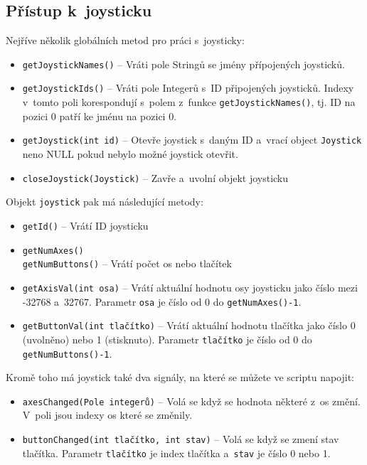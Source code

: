 \documentclass[12pt, a4paper, oneside]{article}
\begin{document}
\newpage
\subsection*{Přístup k~joysticku}
Nejříve několik globálních metod pro práci s~joysticky:
\begin{itemize}
    \item {\color{blue}\verb/getJoystickNames()/} -- Vráti pole Stringů se jmény přípojených joysticků.
    \item {\color{blue}\verb/getJoystickIds()/} -- Vráti pole Integerů s~ID připojených joysticků. Indexy v~tomto poli korespondují s~polem z~funkce \verb|getJoystickNames()|, tj. ID na pozici 0 patří ke jménu na pozici 0.
    \item {\color{blue}\verb/getJoystick(int id)/} -- Otevře joystick s~daným ID a~vrací object \verb|Joystick| neno NULL pokud nebylo možné joystick otevřit.
    \item {\color{blue}\verb/closeJoystick(Joystick)/} -- Zavře a~uvolní objekt joysticku
\end{itemize}
Objekt \verb|joystick| pak má následující metody:
\begin{itemize}
    \item {\color{blue}\verb/getId()/} -- Vrátí ID joysticku
    \item {\color{blue}\verb/getNumAxes()/} \\
          {\color{blue}\verb/getNumButtons()/} -- Vrátí počet os nebo tlačítek
    \item {\color{blue}\verb/getAxisVal(int osa)/} -- Vrátí aktuální hodnotu osy joysticku jako číslo mezi -32768 a~32767. Parametr \verb|osa| je číslo od 0 do \verb|getNumAxes()-1|.
    \item {\color{blue}\verb/getButtonVal(int tlačítko)/} -- Vrátí aktuální hodnotu tlačítka jako číslo 0 (uvolněno) nebo 1 (stisknuto). Parametr \verb|tlačítko| je číslo od 0 do \verb|getNumButtons()-1|.
\end{itemize}
Kromě toho má joystick také dva signály, na které se můžete ve scriptu napojit:
\begin{itemize}
    \item {\color{blue}\verb/axesChanged(Pole integerů)/} -- Volá se když se hodnota některé z~os změní. V~poli jsou indexy os které se změnily.
    \item {\color{blue}\verb/buttonChanged(int tlačítko, int stav)/} -- Volá se když se zmení stav tlačítka. Parametr \verb|tlačítko| je index tlačítka a~\verb|stav| je číslo 0 nebo 1.
\end{itemize}
\end{document}
